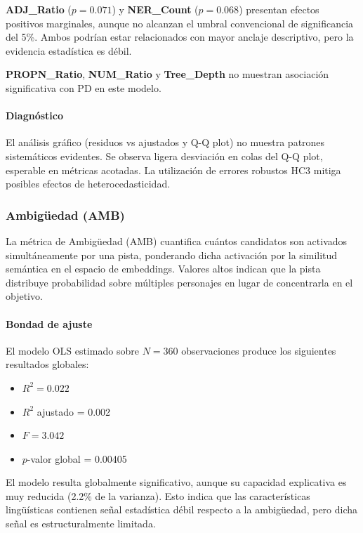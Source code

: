 \textbf{ADJ\_Ratio} ($p = 0.071$) y \textbf{NER\_Count} ($p = 0.068$) presentan efectos positivos marginales, aunque no alcanzan el umbral convencional de significancia del 5\%. Ambos podrían estar relacionados con mayor anclaje descriptivo, pero la evidencia estadística es débil.

\textbf{PROPN\_Ratio}, \textbf{NUM\_Ratio} y \textbf{Tree\_Depth} no muestran asociación significativa con PD en este modelo.

\paragraph{Diagnóstico}

El análisis gráfico (residuos vs ajustados y Q-Q plot) no muestra patrones sistemáticos evidentes. Se observa ligera desviación en colas del Q-Q plot, esperable en métricas acotadas. La utilización de errores robustos HC3 mitiga posibles efectos de heterocedasticidad.

\subsubsection{Ambigüedad (AMB)}

La métrica de Ambigüedad (AMB) cuantifica cuántos candidatos son activados simultáneamente por una pista, ponderando dicha activación por la similitud semántica en el espacio de embeddings. Valores altos indican que la pista distribuye probabilidad sobre múltiples personajes en lugar de concentrarla en el objetivo.

\paragraph{Bondad de ajuste}

El modelo OLS estimado sobre $N = 360$ observaciones produce los siguientes resultados globales:

\begin{itemize}
\item $R^2 = 0.022$
\item $R^2$ ajustado = 0.002
\item $F = 3.042$
\item $p$-valor global = 0.00405
\end{itemize}

El modelo resulta globalmente significativo, aunque su capacidad explicativa es muy reducida (2.2\% de la varianza). Esto indica que las características lingüísticas contienen señal estadística débil respecto a la ambigüedad, pero dicha señal es estructuralmente limitada.

